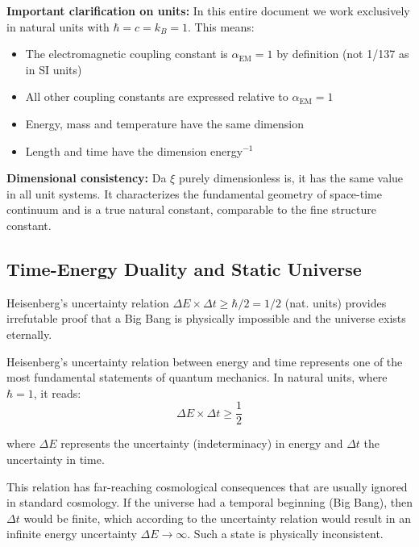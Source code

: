 \documentclass[12pt,a4paper]{article}
\begin{document}
	\textbf{Important clarification on units:}
	In this entire document we work exclusively in natural units with $\hbar = c = k_B = 1$. This means:
	\begin{itemize}
		\item The electromagnetic coupling constant is $\alpha_{\text{EM}} = 1$ by definition (not 1/137 as in SI units)
		\item All other coupling constants are expressed relative to $\alpha_{\text{EM}} = 1$
		\item Energy, mass and temperature have the same dimension
		\item Length and time have the dimension energy$^{-1}$
	\end{itemize}
	
	\textbf{Dimensional consistency:} Da $\xi$ purely dimensionless is, it has the same value in all unit systems. It characterizes the fundamental geometry of space-time continuum and is a true natural constant, comparable to the fine structure constant.
	
	\subsection{Time-Energy Duality and Static Universe}
	
	\begin{important}
		Heisenberg's uncertainty relation $\Delta E \times \Delta t \geq \hbar/2 = 1/2$ (nat. units) provides irrefutable proof that a Big Bang is physically impossible and the universe exists eternally.
	\end{important}
	
	Heisenberg's uncertainty relation between energy and time represents one of the most fundamental statements of quantum mechanics. In natural units, where $\hbar = 1$, it reads:
	\begin{equation}
		\Delta E \times \Delta t \geq \frac{1}{2}
	\end{equation}
	
	where $\Delta E$ represents the uncertainty (indeterminacy) in energy and $\Delta t$ the uncertainty in time.
	
	This relation has far-reaching cosmological consequences that are usually ignored in standard cosmology. If the universe had a temporal beginning (Big Bang), then $\Delta t$ would be finite, which according to the uncertainty relation would result in an infinite energy uncertainty $\Delta E \to \infty$. Such a state is physically inconsistent.
	
\end{document}
